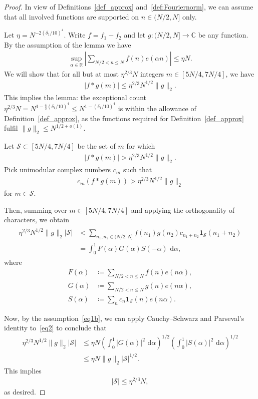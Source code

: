 \documentclass[12pt]{amsart}
\theoremstyle{definition}
\theoremstyle{remark}
\numberwithin{equation}{section}
\newcommand{\1}{\mathbf{1}}
\renewcommand\d{\,\mathrm{d}}
\begin{document}
\begin{proof} 
In view of Definitions~\ref{def_approx} and~\ref{def:Fouriernorm}, we can assume that all involved functions are supported on $n\in (N/2,N]$ only.

Let $\eta=N^{-2(\delta_1/10)^4}$. Write $f=f_1-f_2$ and let $g:(N/2,N]\to \mathbb{C}$ be any function. By the assumption of the lemma we have
	\begin{align}\label{eq1b}
	   \sup_{\alpha \in \mathbb{R}}\left|\sum_{N/2<n\leq  N}f(n)e(\alpha n)\right|\leq \eta N.    
	\end{align}
	We will show that for all but at most $\eta^{2/3} N$ integers $m\in [5N/4,7N/4]$, we have
	\begin{align*}
	   |f*g(m)|\leq \eta^{2/3} N^{1/2}\|g\|_2.  
	\end{align*}
    This implies the lemma: the exceptional count $\eta^{2/3}N=N^{1-\frac43(\delta_1/10)^4}\le N^{1-(\delta_1/10)^4}$ is within the allowance of Definition~\ref{def_approx}, as the functions required for Definition~\ref{def_approx} fulfil $\|g\|_2\leq N^{1/2+o(1)}$.
	
    Let $\mathcal{S}\subset [5N/4,7N/4]$ be the set of $m$ for which
	\begin{align*}
    	|f*g(m)|>  \eta^{2/3} N^{1/2}\|g\|_2.
	\end{align*}
	Pick unimodular complex numbers $c_m$ such that
	\begin{align*}
    	c_m(f*g(m))> \eta^{2/3} N^{1/2}\|g\|_2 
	\end{align*}
	for $m\in \mathcal{S}$. 
		
	Then, summing over $m\in [5N/4,7N/4]$ and applying the orthogonality of characters, we obtain
	\begin{align}\begin{split}\label{eq2}
    	\eta^{2/3} N^{1/2}\|g\|_2|\mathcal{S}|&<\sum_{n_1,n_2\in (N/2,N]}f(n_1)g(n_2)c_{n_1+n_2}\1_{\mathcal{S}}(n_1+n_2)\\
		&= \int_{0}^{1} F(\alpha)G(\alpha)S(-\alpha) \, \d \alpha, 
        \end{split}
	\end{align}
	where
	\begin{align*}
		F(\alpha)&\coloneqq \sum_{N/2<n\leq  N}f(n)e(n\alpha),\\
		G(\alpha)&\coloneqq \sum_{N/2<n\leq N}g(n)e(n\alpha),\\
		S(\alpha)&\coloneqq \sum_{n}c_n\1_{\mathcal{S}}(n)e(n\alpha).
	\end{align*}
		
	Now, by the assumption~\eqref{eq1b}, we can apply Cauchy--Schwarz and Parseval's identity to~\eqref{eq2} to conclude that
	\begin{align*}
		\eta^{2/3} N^{1/2}\|g\|_2|\mathcal{S}|&\leq \eta N\left(\int_{0}^1 |G(\alpha)|^2\, \d\alpha\right)^{1/2} \left(\int_{0}^1 |S(\alpha)|^2\, \d\alpha\right)^{1/2}\\
		&\leq \eta N \|g\|_2|\mathcal{S}|^{1/2}.
	\end{align*}
	This implies
	\begin{align*}
		|\mathcal{S}|\leq  \eta^{2/3} N,
	\end{align*}
	as desired.
\end{proof}
\end{document}
